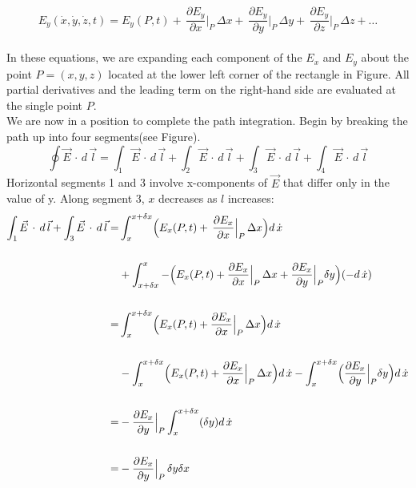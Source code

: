 \documentclass[12pt]{article}
\numberwithin{equation}{section}
\begin{document}
\[
    E_y(\dot{x},\dot{y},\dot{z},t)=E_y(P,t)+\,\frac{\partial{E_y}}{\partial{x}}\Big|_P\,\Delta x+\,\frac{\partial{E_y}}{\partial{y}}\Big|_P\,\Delta y+\,\frac{\partial{E_y}}{\partial{z}}\Big|_P\,\Delta z+\ldots 
\]
\\
In these equations, we are expanding each component of the $E_x$ and $E_y$ about the point $P=(x,y,z)$ located
at the lower left corner of the rectangle in Figure. All partial derivatives and the leading term on the right-hand side are evaluated at the single point $P$.\\
\indent We are now in a position to complete the path integration. Begin by breaking the path up into four segments(see Figure).
\[
    \oint \vec{E}\,\cdot\,d\,\vec{l}=\int_1\vec{E}\,\cdot\,d\,\vec{l}+\int_2\vec{E}\,\cdot\,d\,\vec{l}+\int_3\vec{E}\,\cdot\,d\,\vec{l}+\int_4\vec{E}\,\cdot\,d\,\vec{l}
\]
Horizontal segments 1 and 3 involve x-components of $\vec{E}$ that differ only in the value of y.
Along segment 3, $x$ decreases as $l$ increases:
\[
\begin{split}
    \int_1 \vec{E}\,\cdot\,d\,\vec{l}+\int_3 \vec{E}\,\cdot\,d\,\vec{l}=& \int_{x}^{x+\delta x} \Bigl(E_x(P,t)+\,\frac{\partial{E_x}}{\partial{x}}\Big|_P\,\Delta x\Bigl)d\,\dot{x}\\  
    \\
    & +\int_{x+\delta x}^{x}-\Bigl(E_x(P,t)+\frac{\partial{E_x}}{\partial{x}}\Big|_P\,\Delta x+\frac{\partial{E_x}}{\partial{y}}\Big|_P\delta y\Bigl)(-d\,\dot{x})\\
    \\
    =&\int_{x}^{x+\delta x}\Bigl(E_x(P,t)+\frac{\partial{E_x}}{\partial{x}}\Big|_P\,\Delta x\Bigl)d\,\dot{x}\\
    \\
    &-\int_{x}^{x+\delta x}\Bigl(E_x(P,t)+\frac{\partial{E_x}}{\partial{x}}\Big|_P\,\Delta x\Bigl)d\,\dot{x}-\int_{x}^{x+\delta x}\Bigl(\frac{\partial{E_x}}{\partial y}\Big|_P\delta y\Bigl)d\,\dot{x}\\
    \\
    =&-\frac{\partial{E_x}}{\partial{y}}\Big|_P\int_{x}^{x+\delta x}(\delta y)d\,\dot{x}\\
    \\
    =&-\frac{\partial{E_x}}{\partial{y}}\Big|_P\,\delta y \delta x
\end{split}    
\]
\end{document}
